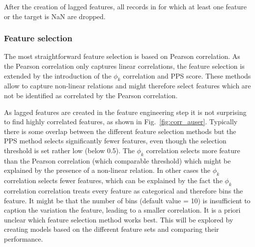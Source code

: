 \documentclass{article}
\begin{document}
After the creation of lagged features, all records in for which at least one feature or the target is NaN are dropped.


\subsubsection*{Feature selection}

The most straightforward feature selection is based on Pearson correlation. As the Pearson correlation only captures linear correlations, the feature selection is extended by the introduction of the $\phi_k$ correlation and PPS score. These methods allow to capture non-linear relations and might therefore select features which are not be identified as correlated by the Pearson correlation.

As lagged features are created in the feature engineering step it is not surprising to find highly correlated features, as shown in Fig.~\ref{fig:corr_auser}. Typically there is some overlap between the different feature selection methods but the PPS method selects significantly fewer features, even though the selection threshold is set rather low (below 0.5). The $\phi_k$ correlation selects more feature than the Pearson correlation (which comparable threshold) which might be explained by the presence of a non-linear relation. In other cases the $\phi_k$ correlation selects fewer features, which can be explained by the fact the $\phi_k$ correlation correlation treats every feature as categorical and therefore bins the feature. It might be that the number of bins (default value = 10) is insufficient to caption the variation the feature, leading to a smaller correlation. It is a priori unclear which feature selection method works best. This will be explored by creating models based on the different feature sets and comparing their performance. 
\end{document}
